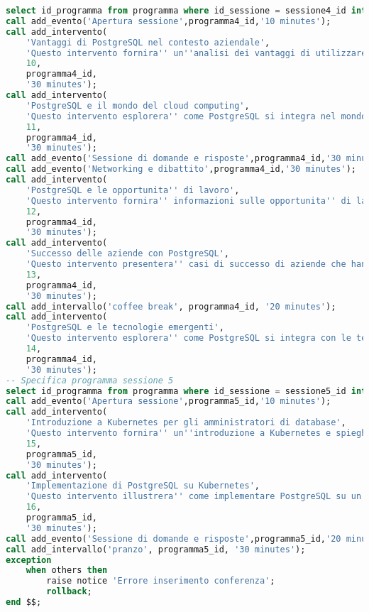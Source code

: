 \begin{lstlisting}[language=SQL, style=mystyle,caption={Conferenza PGConf NPL}]
select id_programma from programma where id_sessione = sessione4_id into programma4_id;
call add_evento('Apertura sessione',programma4_id,'10 minutes');
call add_intervento(
    'Vantaggi di PostgreSQL nel contesto aziendale',
    'Questo intervento fornira'' un''analisi dei vantaggi di utilizzare PostgreSQL nel contesto aziendale, compresa l''affidabilita'', le prestazioni e il supporto della comunita''.',
    10,
    programma4_id,
    '30 minutes');
call add_intervento(
    'PostgreSQL e il mondo del cloud computing',
    'Questo intervento esplorera'' come PostgreSQL si integra nel mondo del cloud computing e come le aziende possono trarre vantaggio dall''utilizzo di PostgreSQL come database cloud-native.',
    11,
    programma4_id,
    '30 minutes');
call add_evento('Sessione di domande e risposte',programma4_id,'30 minutes');
call add_evento('Networking e dibattito',programma4_id,'30 minutes');
call add_intervento(
    'PostgreSQL e le opportunita'' di lavoro',
    'Questo intervento fornira'' informazioni sulle opportunita'' di lavoro e carriera legate all''esperienza con PostgreSQL, inclusi i ruoli professionali, le competenze richieste e le tendenze del mercato.',
    12,
    programma4_id,
    '30 minutes');
call add_intervento(
    'Successo delle aziende con PostgreSQL',
    'Questo intervento presentera'' casi di successo di aziende che hanno adottato PostgreSQL come database principale e i benefici che hanno ottenuto.',
    13,
    programma4_id,
    '30 minutes');
call add_intervallo('coffee break', programma4_id, '20 minutes');
call add_intervento(
    'PostgreSQL e le tecnologie emergenti',
    'Questo intervento esplorera'' come PostgreSQL si integra con le tecnologie emergenti, come l''intelligenza artificiale, l''Internet of Things (IoT) e l''analisi dei big data.',
    14,
    programma4_id,
    '30 minutes');
-- Specifica programma sessione 5
select id_programma from programma where id_sessione = sessione5_id into programma5_id;
call add_evento('Apertura sessione',programma5_id,'10 minutes');
call add_intervento(
    'Introduzione a Kubernetes per gli amministratori di database',
    'Questo intervento fornira'' un''introduzione a Kubernetes e spieghera'' come gli amministratori di database possono utilizzare questa piattaforma per orchestrare e gestire il deployment di istanze di PostgreSQL.',
    15,
    programma5_id,
    '30 minutes');
call add_intervento(
    'Implementazione di PostgreSQL su Kubernetes',
    'Questo intervento illustrera'' come implementare PostgreSQL su un cluster Kubernetes, fornendo linee guida e best practice per il deployment, la scalabilita'' e la gestione delle istanze di PostgreSQL.',
    16,
    programma5_id,
    '30 minutes');
call add_evento('Sessione di domande e risposte',programma5_id,'20 minutes');
call add_intervallo('pranzo', programma5_id, '30 minutes');
exception
    when others then
        raise notice 'Errore inserimento conferenza';
        rollback;
end $$;
\end{lstlisting}